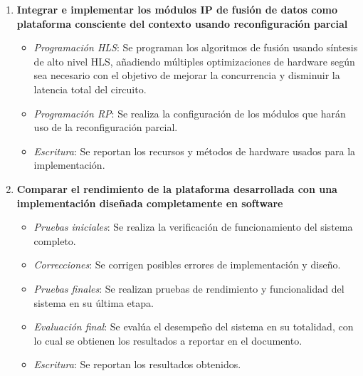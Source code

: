 \begin{enumerate}
\item \textbf{Integrar e implementar los módulos IP de fusión de datos como plataforma consciente del contexto usando reconfiguración parcial}
\begin{itemize}
\item \textit{Programación HLS}: Se programan los algoritmos de fusión usando síntesis de alto nivel HLS, añadiendo múltiples optimizaciones de hardware según sea necesario con el objetivo de mejorar la concurrencia y disminuir la latencia total del circuito.
\item \textit{Programación RP}: Se realiza la configuración de los módulos que harán uso de la reconfiguración parcial.
\item \textit{Escritura}: Se reportan los recursos y métodos de hardware usados para la implementación.
\end{itemize}
\item \textbf{Comparar el rendimiento de la plataforma desarrollada con una implementación diseñada completamente en software}
\begin{itemize}
\item \textit{Pruebas iniciales}: Se realiza la verificación de funcionamiento del sistema completo.
\item \textit{Correcciones}: Se corrigen posibles errores de implementación y diseño.
\item \textit{Pruebas finales}: Se realizan pruebas de rendimiento y funcionalidad del sistema en su última etapa.
\item \textit{Evaluación final}: Se evalúa el desempeño del sistema en su totalidad, con lo cual se obtienen los resultados a reportar en el documento.
\item \textit{Escritura}: Se reportan los resultados obtenidos.
\end{itemize}
\end{enumerate}

  